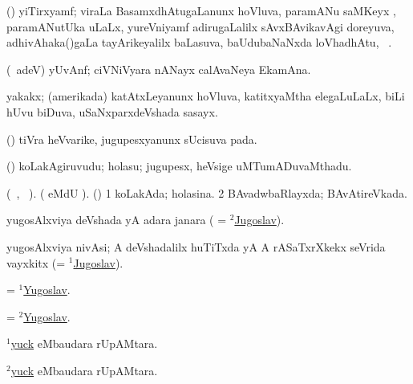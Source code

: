 \bentry
{} 
\gl{\nA} 
\bmng
(\ravi) yiTirxyamf; viraLa BasamxdhAtugaLanunx hoVluva, paramANu saMKeyx , paramANutUka  uLaLx,  yureVniyamf adirugaLalilx sAvxBAvikavAgi doreyuva, adhivAhaka()gaLa tayArikeyalilx baLasuva, baUdubaNaNxda loVhadhAtu, \saMkeV\ .
\emng
\eentry

\bentry
{} 
\gl{\nA} 
\bmng
(\bava\ adeV) yUvAnf; 
ciVNiVyara nANayx calAvaNeya EkamAna.
\emng
\eentry

\bentry
{} 
\gl{\nA} 
\bmng
yakakx; (amerikada) katAtxLeyanunx hoVluva, katitxyaMtha elegaLuLaLx, biLi hUvu biDuva, uSaNxparxdeVshada sasayx. 
\emng
\eentry

\bentry
{} 
\gl{\BAavayx}   
\bmng
(\ashi) tiVra heVvarike, jugupesxyanunx sUcisuva pada.
\emng
\eentry

\bentry
{} 
\gl{\nA}  
\bmng
(\ashi) koLakAgiruvudu; holasu; jugupesx, heVsige uMTumADuvaMthadu.
\emng
\eentry

\bentry
{} 
\gl{\gu} 
\bmng
(\tara\ , \tama\ ).
(  eMdU \parx).  (\ashi) 
\bnum
\num{1} koLakAda; holasina. 
\num{2} BAvadwbaRlayxda; BAvAtireVkada.
\enum
\emng
\eentry

\bentry
{} 
\gl{\gu} 
\bmng
yugosAlxviya deVshada yA adara janara ( = \hyperref{kandict_j.pdf}{J}{Jugoslav(2)}{$^2$Jugoslav}).
\emng
\eentry

\bentry
{} 
\gl{\nA} 
\bmng
yugosAlxviya nivAsi; A deVshadalilx huTiTxda yA A rASaTxrXkekx seVrida vayxkitx (= \hyperref{kandict_j.pdf}{J}{Jugoslav(1)}{$^1$Jugoslav}).
\emng
\eentry

\bentry
{} 
\gl{\gu} 
\bmng
= \hyperlink{Yugoslav(1)}{$^1$Yugoslav}.
\emng
\eentry

\bentry
{} 
\gl{\nA} 
\bmng
= \hyperlink{Yugoslav(2)}{$^2$Yugoslav}.
\emng
\eentry

\bentry
{} 
\gl{\BAavayx} 
\bmng
\hyperlink{yuck(1)}{$^1$yuck} eMbaudara rUpAMtara.
\emng 
\eentry

\bentry
{} 
\gl{\nA} 
\bmng
\hyperlink{yuck(2)}{$^2$yuck} eMbaudara rUpAMtara.
\emng 
\eentry

